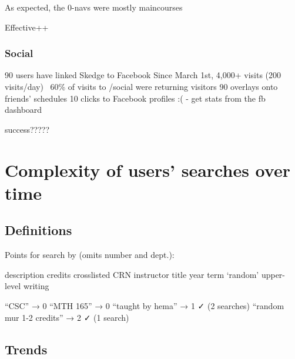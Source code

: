   As expected, the 0-navs were mostly maincourses

  Effective++

  \subsubsection{Social}

  90 users have linked Skedge to Facebook
  Since March 1st,
  4,000+ visits (200 visits/day)
  ~60\% of visits to /social were returning visitors
  90 overlays onto friends’ schedules
  10 clicks to Facebook profiles :(
  - get stats from the fb dashboard

  success?????


\section{Complexity of users' searches over time}

\subsection{Definitions}

Points for search by (omits number and dept.):

description
credits
crosslisted
CRN
instructor
title
year
term
‘random’
upper-level writing

“CSC” → 0
“MTH 165” → 0
“taught by hema” → 1   ✓    (2 searches) 
“random mur 1-2 credits” → 2   ✓    (1 search) 


\subsection{Trends}

